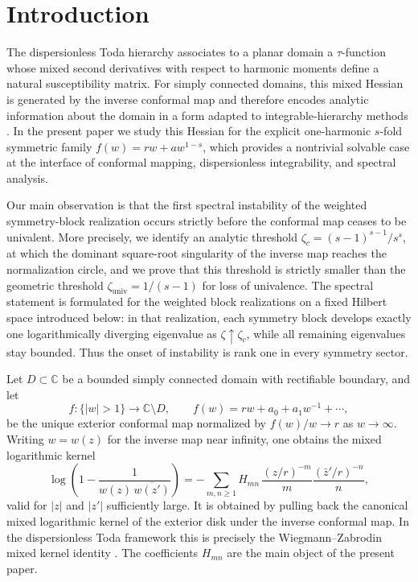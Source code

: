 \documentclass[11pt]{amsart}
\numberwithin{equation}{section}
\theoremstyle{plain}
\theoremstyle{definition}
\theoremstyle{remark}
\newcommand{\CC}{\mathbb{C}}
\begin{document}
\maketitle


\section{Introduction}
\label{sec:intro}


The dispersionless Toda hierarchy associates to a planar domain a
\(\tau\)-function whose mixed second derivatives with respect to harmonic
moments define a natural susceptibility matrix. For simply connected domains,
this mixed Hessian is generated by the inverse conformal map and therefore
encodes analytic information about the domain in a form adapted to
integrable-hierarchy methods
\cite{MineevWeinstein2000,WiegmannZabrodin2000,MarshakovWiegmannZabrodin2002,BOOKtau,Takhtajan2001,GustafssonLin2013,ZabrodinWiegmann2006,Teo2009}.
In the present paper we study this Hessian for the explicit one-harmonic
\(s\)-fold symmetric family $
	f(w)=rw+aw^{1-s}$,
which provides a nontrivial solvable case at the interface of conformal
mapping, dispersionless integrability, and spectral analysis.

Our main observation is that the first spectral instability of the weighted
symmetry-block realization occurs strictly before the conformal map ceases to be univalent. More precisely, we identify
an analytic threshold $\zeta_c=(s-1)^{s-1}/s^s$, at which the dominant
square-root singularity of the inverse map reaches the normalization
circle, and we prove that this threshold is strictly smaller than the
geometric threshold $\zeta_{\mathrm{univ}}=1/(s-1)$ for loss of univalence.
The spectral statement is formulated for the weighted block realizations on a
fixed Hilbert space introduced below: in that realization, each symmetry
block develops exactly one logarithmically diverging eigenvalue as
\(\zeta\uparrow\zeta_c\), while all remaining eigenvalues stay bounded.
Thus the onset of instability is rank one in every symmetry sector.


Let \(D\subset\CC\) be a bounded simply connected domain with rectifiable
boundary, and let
\[
	f:\{|w|>1\}\to\CC\setminus D,
	\qquad
	f(w)=rw+a_0+a_1w^{-1}+\cdots,
\]
be the unique exterior conformal map normalized by \(f(w)/w\to r\) as
\(w\to\infty\). Writing \(w=w(z)\) for the inverse map near infinity, one
obtains the mixed logarithmic kernel
\begin{equation}\label{eq:intro-grunsky}
	\log\!\left(1-\frac{1}{w(z)\,\overline{w(z')}}\right)
	=
	-\sum_{m,n\ge1}H_{mn}\,
	\frac{(z/r)^{-m}}{m}\frac{(\bar z'/r)^{-n}}{n},
\end{equation}
valid for \(|z|\) and \(|z'|\) sufficiently large. It is obtained by pulling
back the canonical mixed logarithmic kernel of the exterior disk under the
inverse conformal map. In the dispersionless Toda framework this is precisely
the Wiegmann--Zabrodin mixed kernel identity
\cite{WiegmannZabrodin2000,BOOKtau}. The coefficients \(H_{mn}\) are the main
object of the present paper.
\end{document}
